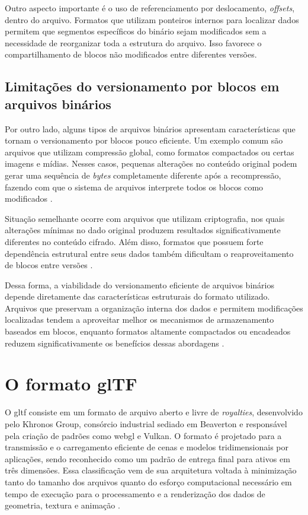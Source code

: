 Outro aspecto importante é o uso de referenciamento por deslocamento, \textit{offsets}, dentro do arquivo. Formatos que utilizam ponteiros internos para localizar dados permitem que segmentos específicos do binário sejam modificados sem a necessidade de reorganizar toda a estrutura do arquivo. Isso favorece o compartilhamento de blocos não modificados entre diferentes versões.

\subsection{Limitações do versionamento por blocos em arquivos binários}

Por outro lado, alguns tipos de arquivos binários apresentam características que tornam o versionamento por blocos pouco eficiente. Um exemplo comum são arquivos que utilizam compressão global, como formatos compactados ou certas imagens e mídias. Nesses casos, pequenas alterações no conteúdo original podem gerar uma sequência de \textit{bytes} completamente diferente após a recompressão, fazendo com que o sistema de arquivos interprete todos os blocos como modificados \cite{Chen2025}.

Situação semelhante ocorre com arquivos que utilizam criptografia, nos quais alterações mínimas no dado original produzem resultados significativamente diferentes no conteúdo cifrado. Além disso, formatos que possuem forte dependência estrutural entre seus dados também dificultam o reaproveitamento de blocos entre versões \cite{Zheng2016}.

Dessa forma, a viabilidade do versionamento eficiente de arquivos binários depende diretamente das características estruturais do formato utilizado. Arquivos que preservam a organização interna dos dados e permitem modificações localizadas tendem a aproveitar melhor os mecanismos de armazenamento baseados em blocos, enquanto formatos altamente compactados ou encadeados reduzem significativamente os benefícios dessas abordagens \cite{Chen2025}.

\section{O formato glTF}

O \gls{gltf} consiste em um formato de arquivo aberto e livre de \textit{royalties},
desenvolvido pelo Khronos Group, consórcio industrial sediado em Beaverton e
responsável pela criação de padrões como \gls{webgl} e Vulkan. O formato é projetado
para a transmissão e o carregamento eficiente de cenas e modelos tridimensionais por
aplicações, sendo reconhecido como um padrão de entrega final para ativos em três
dimensões. Essa classificação vem de sua arquitetura voltada à minimização tanto do
tamanho dos arquivos quanto do esforço computacional necessário em tempo de execução
para o processamento e a renderização dos dados de geometria, textura e animação
\cite{Houston2019}.

